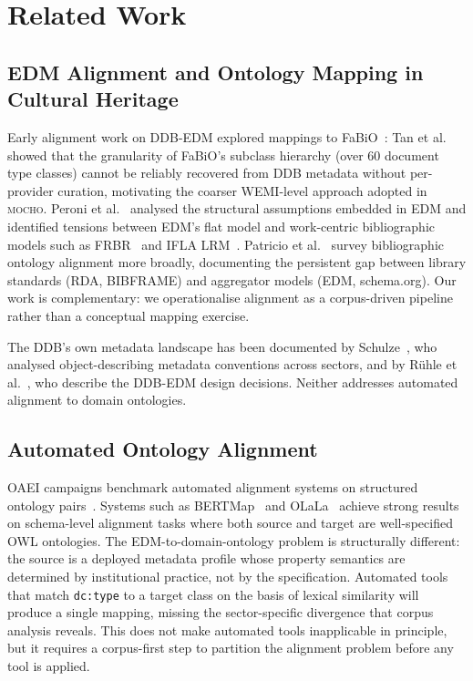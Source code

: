 
\section{Related Work}
\label{sec:related}

\subsection{EDM Alignment and Ontology Mapping in Cultural Heritage}

Early alignment work on DDB-EDM explored mappings to FaBiO~\cite{peroni2012fabio}:
Tan et al.~\cite{tan2021fabio} showed that the granularity of FaBiO's
subclass hierarchy (over 60 document type classes) cannot be reliably
recovered from DDB metadata without per-provider curation, motivating the
coarser WEMI-level approach adopted in \textsc{mocho}.
Peroni et al.~\cite{peroni2013edm} analysed the structural assumptions
embedded in EDM and identified tensions between EDM's flat model and
work-centric bibliographic models such as FRBR~\cite{ifla1998frbr} and
IFLA LRM~\cite{riva2017iflalrm}.
Patricio et al.~\cite{patricio2025weaving} survey bibliographic ontology
alignment more broadly, documenting the persistent gap between library
standards (RDA, BIBFRAME) and aggregator models (EDM, schema.org).
Our work is complementary: we operationalise alignment as a corpus-driven
pipeline rather than a conceptual mapping exercise.

The DDB's own metadata landscape has been documented by
Schulze~\cite{schulze2020ddb}, who analysed object-describing metadata
conventions across sectors, and by Rühle et al.~\cite{ruehle2014ddbedm},
who describe the DDB-EDM design decisions.
Neither addresses automated alignment to domain ontologies.

\subsection{Automated Ontology Alignment}

OAEI campaigns benchmark automated alignment systems on structured ontology
pairs~. Systems such as BERTMap~\cite{he2022bertmap} and
OLaLa~\cite{hertling2023olala} achieve strong results on schema-level
alignment tasks where both source and target are well-specified OWL ontologies.
The EDM-to-domain-ontology problem is structurally different: the source is a
deployed metadata profile whose property semantics are determined by
institutional practice, not by the specification.
Automated tools that match \texttt{dc:type} to a target class on the basis of
lexical similarity will produce a single mapping, missing the sector-specific
divergence that corpus analysis reveals.
This does not make automated tools inapplicable in principle, but it requires
a corpus-first step to partition the alignment problem before any tool is
applied.

